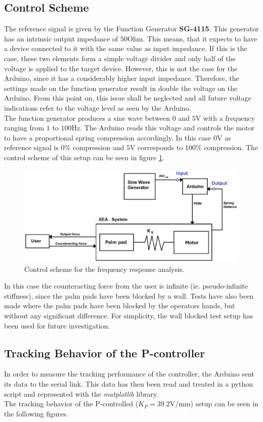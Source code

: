 \subsection{Control Scheme}
The reference signal is given by the Function Generator \textbf{SG-4115}. This generator has an intrinsic output impedance of $50$Ohm. This means, that it expects to have a device connected to it with the same value as input impedance. If this is the case, these two elements form a simple voltage divider and only half of the voltage is applied to the target device. However, this is not the case for the Arduino, since it has a considerably higher input impedance. Therefore, the settings made on the function generator result in double the voltage on the Arduino. From this point on, this issue shall be neglected and all future voltage indications refer to the voltage level as seen by the Arduino.\\
The function generator produces a sine wave between $0$ and $5$V with a frequency ranging from $1$ to $100$Hz. The Arduino reads this voltage and controls the motor to have a proportional spring compression accordingly. In this case $0$V as reference signal is $0\%$ compression and $5$V corresponds to $100\%$ compression. The control scheme of this setup can be seen in figure \ref{fig:frf_measure_points}.
\begin{figure}[h!]
	\centering
	\includegraphics[width=0.6\linewidth]{Figs/frf_measure_points}
	\caption{Control scheme for the frequency response analysis.}
	\label{fig:frf_measure_points}
\end{figure}
In this case the counteracting force from the user is infinite (ie. pseudo-infinite stiffness), since the palm pads have been blocked by a wall. Tests have also been made where the palm pads have been blocked by the operators hands, but without any significant difference. For simplicity, the wall blocked test setup has been used for future investigation.


\subsection{Tracking Behavior of the P-controller}
In order to measure the tracking performance of the controller, the Arduino sent its data to the serial link. This data has then been read and treated in a python script and represented with the \textit{matplotlib} library. \\
The tracking behavior of the P-controlled ($K_P = 39.2$V/mm) setup can be seen in the following figures.

